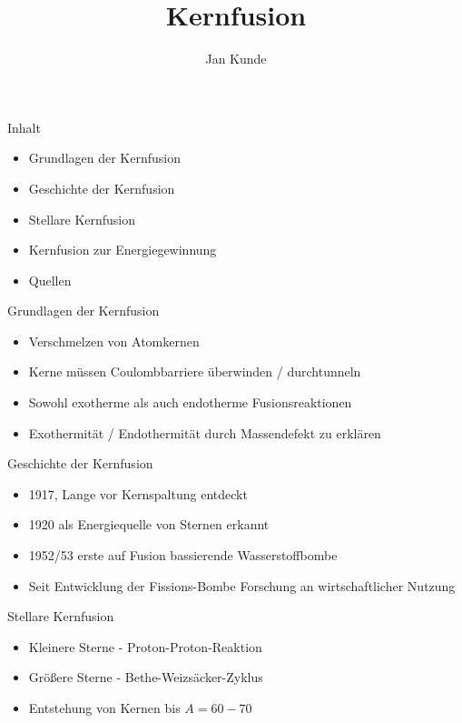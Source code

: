 \documentclass[aspectratio=169,xcolor=dvipsnames,14pt]{beamer}
\title{Kernfusion}
\author{\color{LightGrey}Jan Kunde}
\date{}
\begin{document}
\color{LightGrey}
\begin{frame}{}
\color{LightGrey}
\maketitle
\end{frame}


{
\begin{frame}{Inhalt}
\begin{itemize}
    \color{LightGrey}
\item Grundlagen der Kernfusion
\item Geschichte der Kernfusion
\item Stellare Kernfusion
\item Kernfusion zur Energiegewinnung
\item Quellen
\end{itemize}
\end{frame}
}

{
\begin{frame}{Grundlagen der Kernfusion}
\begin{itemize}
    \color{LightGrey}
\item Verschmelzen von Atomkernen
\item Kerne müssen Coulombbarriere überwinden / durchtunneln   
\item Sowohl exotherme als auch endotherme Fusionsreaktionen
\item Exothermität / Endothermität durch Massendefekt zu erklären
\end{itemize}
\end{frame}
}

{
\begin{frame}{Geschichte der Kernfusion}
\begin{itemize}
    \color{LightGrey}
\item 1917, Lange vor Kernspaltung entdeckt
\item 1920 als Energiequelle von Sternen erkannt
\item 1952/53 erste auf Fusion bassierende Wasserstoffbombe
\item Seit Entwicklung der Fissions-Bombe Forschung an wirtschaftlicher Nutzung
\end{itemize}
\end{frame}
}

{
\begin{frame}{Stellare Kernfusion}
    \begin{itemize}
        \color{LightGrey}
        \item Kleinere Sterne - Proton-Proton-Reaktion
        \item Größere Sterne - Bethe-Weizsäcker-Zyklus
        \item Entstehung von Kernen bis $A = 60-70$
    \end{itemize}
\end{frame}
}
\end{document}
